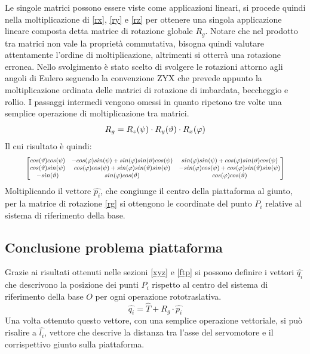 \documentclass[12pt,twoside,openright]{report}
\begin{document}
Le singole matrici possono essere viste come applicazioni lineari, si procede quindi nella moltiplicazione di \eqref{rx}, \eqref{ry} e \eqref{rz} per ottenere una singola applicazione lineare composta detta matrice di rotazione globale $R_g$. Notare che nel prodotto tra matrici non vale la proprietà commutativa, bisogna quindi valutare attentamente l'ordine di moltiplicazione, altrimenti si otterrà una rotazione erronea. Nello svolgimento è stato scelto di svolgere le rotazioni attorno agli angoli di Eulero seguendo la convenzione ZYX\cite{matricerotazione} che prevede appunto la moltiplicazione ordinata delle matrici di rotazione di imbardata, beccheggio e rollio. I passaggi intermedi vengono omessi in quanto ripetono tre volte una semplice operazione di moltiplicazione tra matrici.
\begin{equation}\label{rg}
    R_g = R_z(\psi)\cdot R_y(\vartheta)\cdot R_x(\varphi)\\
\end{equation}
Il cui risultato è quindi:
\begin{equation}\label{rg}
\resizebox{0.9\hsize}{!}{$
\begin{bmatrix}
			cos(\vartheta)cos(\psi) & -cos(\varphi)sin(\psi)+sin(\varphi)sin(\vartheta)cos(\psi) & sin(\varphi)sin(\psi)+cos(\varphi)sin(\vartheta)cos(\psi)\\
			cos(\vartheta)sin(\psi) & cos(\varphi)cos(\psi)+sin(\varphi)sin(\vartheta)sin(\psi) & -sin(\varphi)cos(\psi)+cos(\varphi)sin(\vartheta)sin(\psi)\\
			-sin(\vartheta) & sin(\varphi)cos(\vartheta) & cos(\varphi)cos(\vartheta)
			\end{bmatrix}$}
\end{equation}
Moltiplicando il vettore $\hat{p_i}$, che congiunge il centro della piattaforma al giunto, per la matrice di rotazione \eqref{rg} si ottengono le coordinate del punto $P_i$ relative al sistema di riferimento della base. 

\subsection{Conclusione problema piattaforma}
Grazie ai risultati ottenuti nelle sezioni \ref{xyz} e \ref{ftp} si possono definire i vettori $\hat{q_i}$ che descrivono la posizione dei punti $P_i$ rispetto al centro del sistema di riferimento della base $O$ per ogni operazione rototraslativa.
\begin{equation}\label{qi}
\hat{q_i}=\hat{T}+R_g\cdot \hat{p_i}
\end{equation}
Una volta ottenuto questo vettore, con una semplice operazione vettoriale, si può risalire a $\hat{l_i}$, vettore che descrive la distanza tra l'asse del servomotore e il corrispettivo giunto sulla piattaforma.
\end{document}
